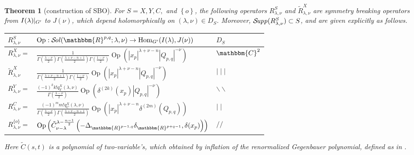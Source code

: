\documentclass[reqno,12pt]{pja00} %
\newcommand{\tmop}[1]{\ensuremath{\operatorname{#1}}}
\newtheorem{theorem}{Theorem}
\newcommand{\Sol}{\mathcal{S}\!{\it ol}}
\newcommand{\Supp}{\mathcal{S}\!{\it upp}}
\theoremstyle{definition}
\theoremstyle{exampstyle} \newtheorem{examp}[theorem]{Theorem}
\renewcommand{\Q}{Q_{p,q}}
\newcommand{\IlambdaGprime}{I(\lambda)\kern-0.3em\mid_{G'}}
\begin{document}
\begin{theorem}[construction of SBO]\label{thm:construction}
	For $S=X,Y,C,$ and $\left\{ o \right\}$, the following operators $R_{\lambda,\nu}^S$ and $\tilde{R}_{\lambda,\nu}^X$ are symmetry breaking operators from $\IlambdaGprime$ to $J(\nu)$, which depend holomorphically on $(\lambda,\nu)\in D_S$. Moreover, $\Supp(R_{\lambda,\nu}^S)\subset S$, and are given explicitly as follows.

	\hspace*{-1cm}
	\begin{tabular}[c]{@{}|@{}l@{}|@{}l@{}|l@{}|}
  \hline
  $R_{\lambda,\nu}^S$& $\tmop{Op} : 
  \Sol(\mathbbm{R}^{p, q} ; \lambda, \nu)
  \rightarrow \tmop{Hom}_{G'} (I (\lambda), J (\nu))$ & $D_S\,$ 
  \\
  \hline
  $R_{\lambda, \nu}^X =$ & $ \frac{1}{\Gamma \left( \frac{\lambda - \nu}{2} \right) \Gamma \left(
  \frac{\lambda + \nu - n + 1}{2} \right) \Gamma \left( \frac{1 - \nu}{2}
  \right)}{\tmop{Op} \left(| x_p |^{\lambda + \nu - n}
  | \Q |^{- \nu} \right)}$ & $\mathbbm{C}^2$ \\
  \hline
  $\tilde{R}_{\lambda,\nu}^X$ &$\frac{1}{ \Gamma \left(
  \frac{\lambda + \nu - n + 1}{2} \right) \Gamma \left( \frac{1 - \nu}{2}
  \right)}{\tmop{Op} \left(| x_p |^{\lambda + \nu - n}
  | \Q |^{- \nu} \right)}$ & $\mid\mid\mid$ 
  \\\hline
  $R_{\lambda, \nu}^Y =$ & $\frac{(-1)^k k! q_Y^X (\lambda, \nu)}{\Gamma \left( \frac{\lambda - \nu}{2}
  \right) }{\tmop{Op} \left( \delta^{(2k)}(x_p)
  | \Q |^{- \nu}  \right)}$ & $
  \backslash\backslash$ \\
  \hline
  $R_{\lambda, \nu}^C =$ & $\frac{(-1)^m m! q_C^X (\lambda, \nu)}{\Gamma \left( \frac{\lambda - \nu}{2}
  \right) \Gamma \left( \frac{\lambda + \nu - n + 1}{2} \right) }{\tmop{Op} \left( | x_p |^{\lambda + \nu - n}\delta^{(2m)}\left( \Q \right)
    \right)}$ & $ \mid \mid$ \\
  \hline
  $R_{\lambda, \nu}^{\{ o \}} =$ & 
  $\tmop{Op} \left( \tilde{C}_{\nu -
  \lambda}^{\lambda - \frac{n - 1}{2}} \left(-\Delta_{\mathbbm{R}^{p - 1, q}}
  \delta_{\mathbbm{R}^{p + q - 1}}, \delta (x_p)\right) \right)
  $ & $
  / /$\\
  \hline
\end{tabular}

Here $\tilde{C}(s,t)$ is a polynomial of two-variable's, which obtained by inflation of the renormalized Gegenbauer polynomial, defined as in \cite[(16.3)]{kobayashi2015symmetry}.
\end{theorem}
\end{document}
